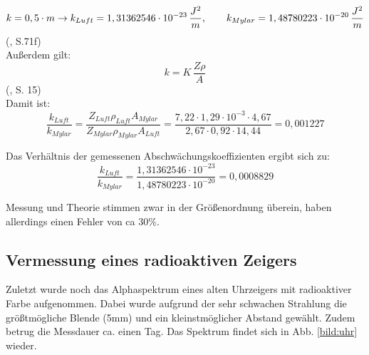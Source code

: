 \begin{equation}
    k = 0,5 \cdot m \\
    \to k_{Luft} = 1,31362546 \cdot 10^{-23} \, \frac{J^2}{m}, \qquad k_{Mylar} = 1,48780223 \cdot 10^{-20} \, \frac{J^2}{m}
\end{equation}
(\cite{Jaekel1997}, S.71f) \\

Außerdem gilt: \\

\begin{equation}
    k = K \, \frac{Z \rho}{A}
\end{equation}
(\cite{Kador2021}, S. 15) \\

Damit ist: \\

\begin{equation}
    \frac{k_{Luft}}{k_{Mylar}} = \frac{Z_{Luft} \rho_{Luft} A_{Mylar}}{Z_{Mylar} \rho_{Mylar} A_{Luft}} = 
    \frac{7,22 \cdot 1,29 \cdot 10^{-3} \cdot 4,67}{2,67 \cdot 0,92 \cdot 14,44} = 0,001227
\end{equation}
 
Das Verhältnis der gemessenen Abschwächungskoeffizienten ergibt sich zu:\\

\begin{equation}
    \frac{k_{Luft}}{k_{Mylar}} = \frac{1,31362546 \cdot 10^{-23}}{1,48780223 \cdot 10^{-20}} = 0,0008829
\end{equation}

Messung und Theorie stimmen zwar in der Größenordnung überein, haben allerdings einen Fehler von ca 30\%. 

\subsection{Vermessung eines radioaktiven Zeigers}

Zuletzt wurde noch das Alphaspektrum eines alten Uhrzeigers mit radioaktiver Farbe aufgenommen. Dabei wurde aufgrund der sehr schwachen 
Strahlung die größtmögliche Blende (5mm) und ein kleinstmöglicher Abstand gewählt. Zudem betrug die Messdauer ca. einen Tag. Das 
Spektrum findet sich in Abb. \ref{bild:uhr} wieder. \\

